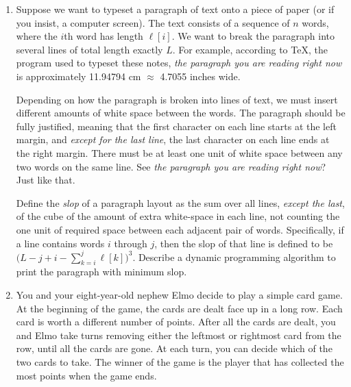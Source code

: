 \begin{enumerate}[label=\arabic*.,ref=\thechapter.\arabic*,leftmargin=*,align=left,widest*=99,itemsep=1.5ex plus 0.5ex]
\item Suppose we want to typeset a paragraph of text onto a piece of paper (or if you insist, a computer screen).
The text consists of a sequence of $n$ words, where the $i$th word has length $\ell[i]$.
We want to break the paragraph into several lines of total length exactly $L$.
For example, according to \TeX, the program used to typeset these notes, \textit{the paragraph you are reading right now} is approximately 11.94794 cm $\approx$ 4.7055 inches wide.

Depending on how the paragraph is broken into lines of text, we must insert different amounts of white space between the words.
The paragraph should be fully justified, meaning that the first character on each line starts at the left margin, and \textit{except for the last line}, the last character on each line ends at the right margin.
There must be at least one unit of white space between any two words on the same line.
See \textit{the paragraph you are reading right now}?
Just like that.

Define the \textit{slop} of a paragraph layout as the sum over all lines, \textit{except the last}, of the cube of the amount of extra white-space in each line, not counting the one unit of required space between each adjacent pair of words.
Specifically, if a line contains words $i$ through $j$, then the slop of that line is defined to be $\bigl(L - j + i - \sum_{k=i}^{j} \ell[k]\bigr)^3$.
Describe a dynamic programming algorithm to print the paragraph with minimum slop.

\item You and your eight-year-old nephew Elmo decide to play a simple card game.
At the beginning of the game, the cards are dealt face up in a long row.
Each card is worth a different number of points.
After all the cards are dealt, you and Elmo take turns removing either the leftmost or rightmost card from the row, until all the cards are gone.
At each turn, you can decide which of the two cards to take.
The winner of the game is the player that has collected the most points when the game ends.


\end{enumerate}
